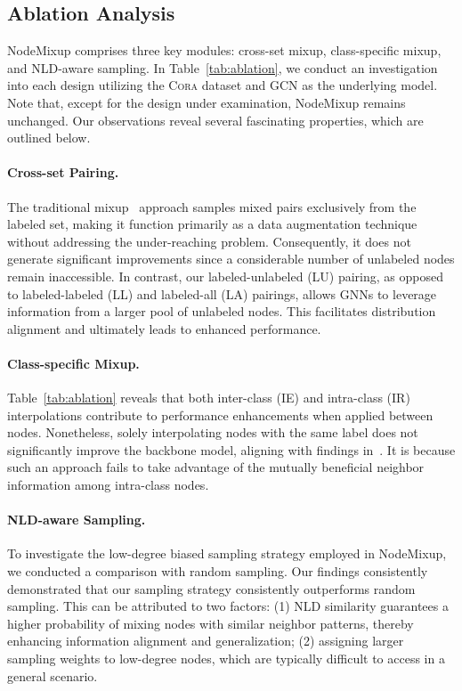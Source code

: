 \documentclass[letterpaper]{article} %
\begin{document}
\subsection{Ablation Analysis}
\label{sec:abla}
NodeMixup comprises three key modules: cross-set mixup, class-specific mixup, and NLD-aware sampling. In Table~\ref{tab:ablation}, we conduct an investigation into each design utilizing the \textsc{Cora} dataset and GCN as the underlying model. Note that, except for the design under examination, NodeMixup remains unchanged. Our observations reveal several fascinating properties, which are outlined below.

 \paragraph{Cross-set Pairing.} The traditional mixup~\cite{mixup} approach samples mixed pairs exclusively from the labeled set, making it function primarily as a data augmentation technique without addressing the under-reaching problem. Consequently, it does not generate significant improvements since a considerable number of unlabeled nodes remain inaccessible. In contrast, our labeled-unlabeled (LU) pairing, as opposed to labeled-labeled (LL) and labeled-all (LA) pairings, allows GNNs to leverage information from a larger pool of unlabeled nodes. This facilitates distribution alignment and ultimately leads to enhanced performance.

 \paragraph{Class-specific Mixup.} Table~\ref{tab:ablation} reveals that both inter-class (IE) and intra-class (IR) interpolations contribute to performance enhancements when applied between nodes. Nonetheless, solely interpolating nodes with the same label does not significantly improve the backbone model, aligning with findings in~\cite{mixup}. It is because such an approach fails to take advantage of the mutually beneficial neighbor information among intra-class nodes.

 \paragraph{NLD-aware Sampling.} To investigate the low-degree biased sampling strategy employed in NodeMixup, we conducted a comparison with random sampling. Our findings consistently demonstrated that our sampling strategy consistently outperforms random sampling. This can be attributed to two factors: (1) NLD similarity guarantees a higher probability of mixing nodes with similar neighbor patterns, thereby enhancing information alignment and generalization; (2) assigning larger sampling weights to low-degree nodes, which are typically difficult to access in a general scenario.
\end{document}
